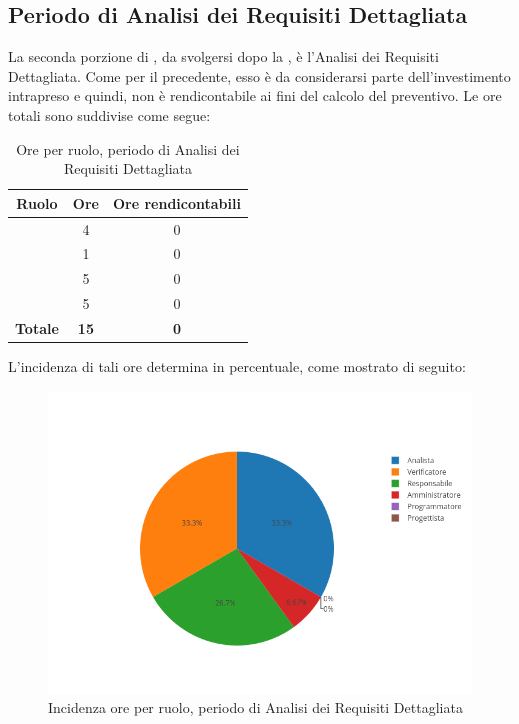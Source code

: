\subsection{Periodo di Analisi dei Requisiti Dettagliata}
La seconda porzione di \AdR, da svolgersi dopo la \RR, è l'Analisi dei Requisiti Dettagliata. Come per il precedente, esso è da considerarsi parte dell'investimento intrapreso e quindi, non è rendicontabile ai fini del calcolo del preventivo. Le ore totali sono suddivise come segue:

\begin{table}[H]
	\begin{center}
		\begin{tabular}{|c|c|c|}
			\hline
			\textbf{Ruolo}	& \textbf{Ore}	& \textbf{Ore rendicontabili} \\
			\hline
			\Res	&   4 	&  0  \\
			\hline
			\Amm	&   1	&  0	\\
			\hline
			\Ana	&   5	&  0	\\
			\hline
			\Ver	&   5	&  0	\\
			\hline
			\textbf{Totale} & \textbf{15} & \textbf{0} \\
			\hline
		\end{tabular}
	\end{center}
	\caption{Ore per ruolo, periodo di Analisi dei Requisiti Dettagliata}
\end{table}

L'incidenza di tali ore determina in percentuale, come mostrato di seguito:
\begin{figure}[H]
	\centering
	\includegraphics[scale=0.6]{img/AnalisiRequisitiDettaglio.png}
	\caption{Incidenza ore per ruolo, periodo di Analisi dei Requisiti Dettagliata}
\end{figure}

